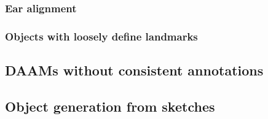 
\subsubsection{Ear alignment}


\subsubsection{Objects with loosely define landmarks}


\subsection{DAAMs without consistent annotations}
\label{exp:3}

\subsection{Object generation from sketches}
\label{exp:4}

